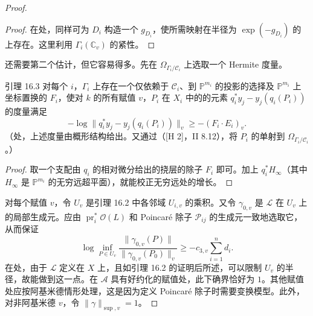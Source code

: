\begin{proof}
\begin{proof}
在处，同样可为 $D_i$ 构造一个  $g_{D_i}$，使所需映射在半径为 $\exp(-g_{D_i})$ 的上存在。这里利用 $\Gamma_i(\mathbb C_v)$ 的紧性。
\end{proof}
还需要第二个估计，但它容易得多。先在 $\Omega_{\Gamma_i/\mathscr C_i}$ 上选取一个 Hermite 度量。
\begin{statement}{引理 16.3}
对每个 $i$，$\Gamma_i$ 上存在一个仅依赖于 $\mathscr C_i$、到 $\mathbb P^{m_i}$ 的投影的选择及 $\mathbb P^{m_i}$ 上坐标置换的 $F_i$，使对 $k$ 的所有赋值 $v$，$P_i$ 在 $X_i$ 中的的元素 $q_i^*y_j-y_j(q_i(P_i))$ 的度量满足
\[
-\log\|q_i^*y_j-y_j(q_i(P_i))\|_v\ge-(F_i\cdot E_i)_v.
\]
（处，上述度量由概形结构给出。又通过（[H 2]，II 8.12），将 $P_i$ 的单射到 $\Omega_{\Gamma_i/\mathscr C_i}$。）
\end{statement}
\begin{proof}
取一个支配由 $q_i$ 的相对微分给出的挠层的除子 $F_i$ 即可。加上 $q_i^*H_\infty$（其中 $H_\infty$ 是 $\mathbb P^{m_i}$ 的无穷远超平面），就能校正无穷远处的增长。
\end{proof}
对每个赋值 $v$，令 $U_v$ 是引理 16.2 中各邻域 $U_{i,v}$ 的乘积。又令 $\gamma_{0,v}$ 是 $\mathscr L$ 在 $U_v$ 上的局部生成元。应由 $\operatorname{pr}_i^*\mathcal O(L)$ 和 Poincaré 除子 $\mathscr P_{ij}$ 的生成元一致地选取它，从而保证
\begin{equation*}\tag{16.4}
\log\inf_{P\in U_v}\frac{\|\gamma_{0,v}(P)\|}{\|\gamma_{0,v}(P_0)\|_v}
\ge-c_{3,v}\sum_{i=1}^n d_i.
\end{equation*}
在处，由于 $\mathscr L$ 定义在 $X$ 上，且如引理 16.2 的证明后所述，可以限制 $U_v$ 的半径，故能做到这一点。在 $\mathscr A$ 具有好约化的赋值处，此下确界恰好为 $1$。其他赋值处应按阿基米德情形处理，这是因为定义 Poincaré 除子时需要变换模型。此外，对非阿基米德 $v$，令 $\|\gamma\|_{\sup,v}=1$。


\end{proof}
